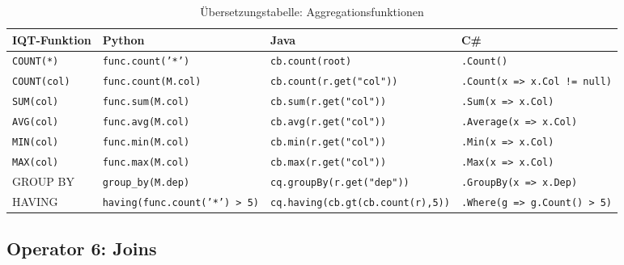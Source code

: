 \begin{table}
\centering
\caption{Übersetzungstabelle: Aggregationsfunktionen}
\label{tab:agg_ops}
\renewcommand{\arraystretch}{1.4}
\begin{tabularx}{\textwidth}{lXXX}
\toprule
\textbf{IQT-Funktion} & \textbf{Python} & \textbf{Java} & \textbf{C\#} \\
\midrule
\texttt{COUNT(*)}
  & \texttt{func.count('*')}
  & \texttt{cb.count(root)}
  & \texttt{.Count()} \\
\texttt{COUNT(col)}
  & \texttt{func.count(M.col)}
  & \texttt{cb.count(r.get("col"))}
  & \texttt{.Count(x => x.Col != null)} \\
\texttt{SUM(col)}
  & \texttt{func.sum(M.col)}
  & \texttt{cb.sum(r.get("col"))}
  & \texttt{.Sum(x => x.Col)} \\
\texttt{AVG(col)}
  & \texttt{func.avg(M.col)}
  & \texttt{cb.avg(r.get("col"))}
  & \texttt{.Average(x => x.Col)} \\
\texttt{MIN(col)}
  & \texttt{func.min(M.col)}
  & \texttt{cb.min(r.get("col"))}
  & \texttt{.Min(x => x.Col)} \\
\texttt{MAX(col)}
  & \texttt{func.max(M.col)}
  & \texttt{cb.max(r.get("col"))}
  & \texttt{.Max(x => x.Col)} \\
GROUP BY
  & \texttt{group\_by(M.dep)}
  & \texttt{cq.groupBy(r.get("dep"))}
  & \texttt{.GroupBy(x => x.Dep)} \\
HAVING
  & \texttt{having(func.count('*') > 5)}
  & \texttt{cq.having(cb.gt(cb.count(r),5))}
  & \texttt{.Where(g => g.Count() > 5)} \\
\bottomrule
\end{tabularx}
\end{table}

\subsection{Operator 6: Joins}
\label{subsec:op_join}

